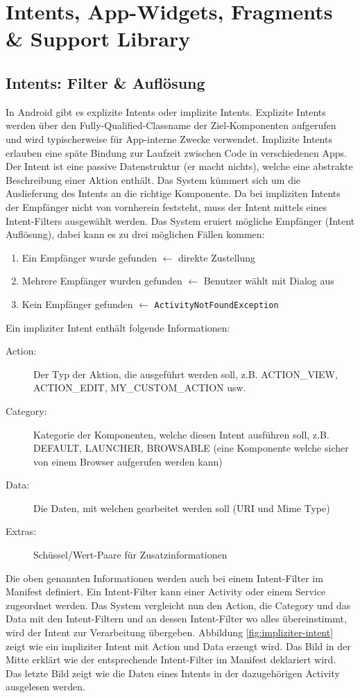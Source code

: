\chapter{Intents, App-Widgets, Fragments \& Support Library}

\section{Intents: Filter \& Auflösung}

In Android gibt es explizite Intents oder implizite Intents. Explizite Intents werden über den Fully-Qualified-Classname der Ziel-Komponenten aufgerufen und wird typischerweise für App-interne Zwecke verwendet. Implizite Intents erlauben eine späte Bindung zur Laufzeit zwischen Code in verschiedenen Apps. Der Intent ist eine passive Datenstruktur (er macht nichts), welche eine abstrakte Beschreibung einer Aktion enthält. Das System kümmert sich um die Auslieferung des Intents an die richtige Komponente.
Da bei impliziten Intents der Empfänger nicht von vornherein feststeht, muss der Intent mittels eines Intent-Filters ausgewählt werden. Das System eruiert mögliche Empfänger (Intent Auflösung), dabei kann es zu drei möglichen Fällen kommen:
\begin{enumerate}
	\item Ein Empfänger wurde gefunden $\leftarrow$ direkte Zustellung
	\item Mehrere Empfänger wurden gefunden $\leftarrow$ Benutzer wählt mit Dialog aus
	\item Kein Empfänger gefunden $\leftarrow$ \texttt{ActivityNotFoundException}
\end{enumerate}
Ein impliziter Intent enthält folgende Informationen:
\begin{description}
	\item[Action:] Der Typ der Aktion, die ausgeführt werden soll, z.B. ACTION\_VIEW, ACTION\_EDIT, MY\_CUSTOM\_ACTION usw.
	\item[Category:] Kategorie der Komponenten, welche diesen Intent ausführen soll, z.B. DEFAULT, LAUNCHER, BROWSABLE (eine Komponente welche sicher von einem Browser aufgerufen werden kann)
	\item[Data:] Die Daten, mit welchen gearbeitet werden soll (URI und Mime Type)
	\item[Extras:] Schüssel/Wert-Paare für Zusatzinformationen
\end{description}
Die oben genannten Informationen werden auch bei einem Intent-Filter im Manifest definiert. Ein Intent-Filter kann einer Activity oder einem Service zugeordnet werden. Das System vergleicht nun den Action, die Category und das Data mit den Intent-Filtern und an dessen Intent-Filter wo alles übereinstimmt, wird der Intent zur Verarbeitung übergeben. Abbildung \ref{fig:impliziter-intent} zeigt wie ein impliziter Intent mit Action und Data erzeugt wird. Das Bild in der Mitte erklärt wie der entsprechende Intent-Filter im Manifest deklariert wird. Das letzte Bild zeigt wie die Daten eines Intents in der dazugehörigen Activity ausgelesen werden.
